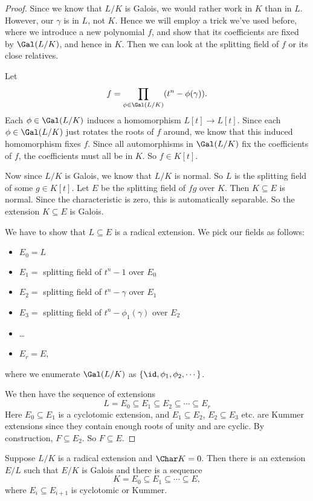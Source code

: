\documentclass[a4paper]{article}
\begin{document}
\begin{proof}
  Since we know that $L/K$ is Galois, we would rather work in $K$ than in $L$. However, our $\gamma$ is in $L$, not $K$. Hence we will employ a trick we've used before, where we introduce a new polynomial $f$, and show that its coefficients are fixed by $\Gal(L/K)$, and hence in $K$. Then we can look at the splitting field of $f$ or its close relatives.

  Let
  \[
    f = \prod_{\phi \in \Gal(L/K)} (t^n - \phi(\gamma)).
  \]
  Each $\phi \in \Gal(L/K)$ induces a homomorphism $L[t] \to L[t]$. Since each $\phi \in \Gal(L/K)$ just rotates the roots of $f$ around, we know that this induced homomorphism fixes $f$. Since all automorphisms in $\Gal(L/K)$ fix the coefficients of $f$, the coefficients must all be in $K$. So $f \in K[t]$.

  Now since $L/K$ is Galois, we know that $L/K$ is normal. So $L$ is the splitting field of some $g \in K[t]$. Let $E$ be the splitting field of $fg$ over $K$. Then $K\subseteq E$ is normal. Since the characteristic is zero, this is automatically separable. So the extension $K\subseteq E$ is Galois.

  We have to show that $L \subseteq E$ is a radical extension. We pick our fields as follows:
  \begin{itemize}
    \item $E_0 = L$
    \item $E_1 = $ splitting field of $t^n - 1$ over $E_0$
    \item $E_2 = $ splitting field of $t^n - \gamma$ over $E_1$
    \item $E_3 = $ splitting field of $t^n - \phi_1(\gamma)$ over $E_2$
    \item \ldots
    \item $E_r = E$,
  \end{itemize}
  where we enumerate $\Gal(L/K)$ as $\{\id , \phi_1, \phi_2, \cdots\}$.

  We then have the sequence of extensions
  \[
    L = E_0 \subseteq E_1 \subseteq E_2 \subseteq \cdots \subseteq E_r
  \]
  Here $E_0 \subseteq E_1$ is a cyclotomic extension, and $E_1 \subseteq E_2$, $E_2 \subseteq E_3$ etc. are Kummer extensions since they contain enough roots of unity and are cyclic. By construction, $F \subseteq E_2$. So $F\subseteq E$.
\end{proof}

\begin{thm}
  Suppose $L/K$ is a radical extension and $\Char K = 0$. Then there is an extension $E/L$ such that $E/K$ is Galois and there is a sequence
  \[
    K = E_0 \subseteq E_1 \subseteq \cdots \subseteq E,
  \]
  where $E_i \subseteq E_{i + 1}$ is cyclotomic or Kummer.
\end{thm}
\end{document}
